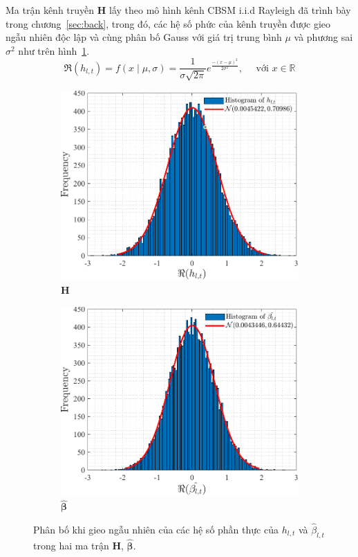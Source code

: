 Ma trận kênh truyền $\mathbf{H}$ lấy theo mô hình kênh CBSM i.i.d Rayleigh đã trình bày trong chương~\ref{sec:back}, trong đó, các hệ số phức của kênh truyền được gieo ngẫu nhiên độc lập và cùng phân bố Gauss với giá trị trung bình $\mu$ và phương sai $\sigma^2$ như trên hình~\ref{fig:ray_H}.
\begin{equation}
\Re(h_{l, t})=f(x \mid \mu, \sigma)=\frac{1}{\sigma \sqrt{2 \pi}} e^{\frac{-(x-\mu)^2}{2 \sigma^2}}, \quad \text { với } x \in \mathbb{R}
\end{equation}
\begin{figure}
    \centering
    \begin{subfigure}{.48\linewidth}
        \includegraphics[width=\linewidth]{figures/H.pdf}
        \caption{$\mathbf{H}$}
        \label{fig:ray_H}
    \end{subfigure}
    \hfill
    \begin{subfigure}{.48\linewidth}
        \includegraphics[width=\linewidth]{figures/Beta.pdf}
        \caption{$\hat{\boldsymbol{\beta}}$}
        \label{fig:ray_Beta}
    \end{subfigure}
    \caption{Phân bố khi gieo ngẫu nhiên của các hệ số phần thực của $h_{l, t}$ và $ \hat{\beta}_{l, t}$ trong hai ma trận $\mathbf{H}$, $\hat{\boldsymbol{\beta}}$.}
    \label{fig:ray}
\end{figure}

